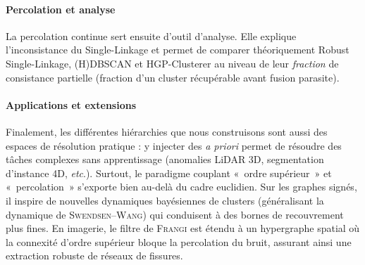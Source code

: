 \begin{AbstractPage}
\begin{resume}
\paragraph{Percolation et analyse}
La percolation continue sert ensuite d'outil d'analyse. Elle explique l'inconsistance du Single-Linkage et permet de comparer théoriquement Robust Single-Linkage, (H)DBSCAN et HGP-Clusterer au niveau de leur \emph{fraction} de consistance partielle (fraction d'un cluster récupérable avant fusion parasite). 



\paragraph{Applications et extensions}
Finalement, les différentes hiérarchies que nous construisons sont aussi des espaces de résolution pratique : y injecter des \emph{a priori} permet de résoudre des tâches complexes sans apprentissage (anomalies LiDAR 3D, segmentation d'instance 4D, \emph{etc}.). Surtout, le paradigme couplant «~ordre supérieur~» et «~percolation~» s'exporte bien au-delà du cadre euclidien. Sur les graphes signés, il inspire de nouvelles dynamiques bayésiennes de clusters (généralisant la dynamique de \textsc{Swendsen--Wang}) qui conduisent à des bornes de recouvrement plus fines. En imagerie, le filtre de \textsc{Frangi} est étendu à un hypergraphe spatial où la connexité d'ordre supérieur bloque la percolation du bruit, assurant ainsi une extraction robuste de réseaux de fissures.



\end{resume}
\end{AbstractPage}

